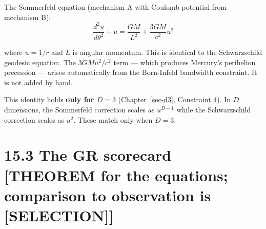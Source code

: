 \documentclass[
  11pt,
  letterpaper,
  twoside,
  openright]{book}
\begin{document}
The Sommerfeld equation (mechanism A with Coulomb potential from
mechanism B): \[
\frac{d^2 u}{d\theta^2} + u = \frac{GM}{L^2} + \frac{3GM}{c^2} u^2
\tag{15.4}
\]

where \(u = 1/r\) and \(L\) is angular momentum. This is identical to
the Schwarzschild geodesic equation. The \(3GM u^2/c^2\) term --- which
produces Mercury's perihelion precession --- arises automatically from
the Born-Infeld bandwidth constraint. It is not added by hand.

This identity holds \textbf{only for \(D = 3\)} (Chapter~\ref{sec-d3},
Constraint 4). In \(D\) dimensions, the Sommerfeld correction scales as
\(u^{D-1}\) while the Schwarzschild correction scales as \(u^2\). These
match only when \(D = 3\).

\section{15.3 The GR scorecard {[}THEOREM for the equations; comparison
to observation is
{[}SELECTION{]}{]}}\label{the-gr-scorecard-theorem-for-the-equations-comparison-to-observation-is-selection}
\end{document}
